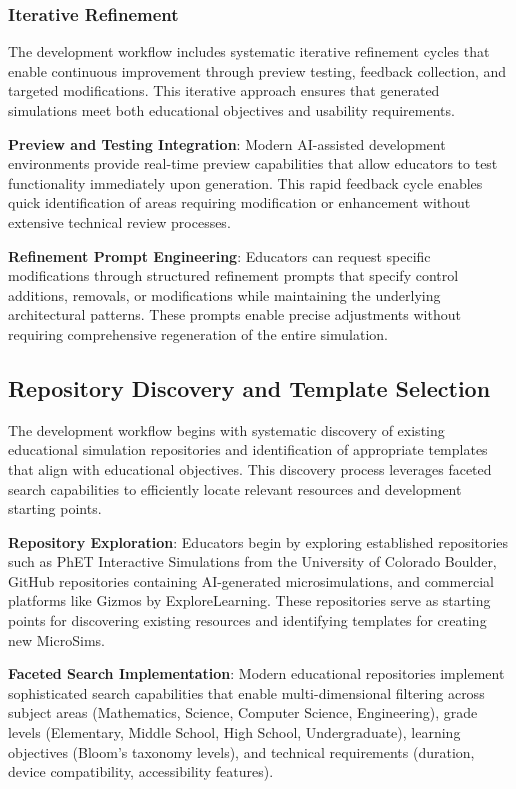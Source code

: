 \subsubsection{Iterative Refinement}

The development workflow includes systematic iterative refinement cycles that enable continuous improvement through preview testing, feedback collection, and targeted modifications. This iterative approach ensures that generated simulations meet both educational objectives and usability requirements.

\textbf{Preview and Testing Integration}: Modern AI-assisted development environments provide real-time preview capabilities that allow educators to test functionality immediately upon generation. This rapid feedback cycle enables quick identification of areas requiring modification or enhancement without extensive technical review processes.

\textbf{Refinement Prompt Engineering}: Educators can request specific modifications through structured refinement prompts that specify control additions, removals, or modifications while maintaining the underlying architectural patterns. These prompts enable precise adjustments without requiring comprehensive regeneration of the entire simulation.

\subsection{Repository Discovery and Template Selection}

The development workflow begins with systematic discovery of existing educational simulation repositories and identification of appropriate templates that align with educational objectives. This discovery process leverages faceted search capabilities to efficiently locate relevant resources and development starting points.

\textbf{Repository Exploration}: Educators begin by exploring established repositories such as PhET Interactive Simulations from the University of Colorado Boulder, GitHub repositories containing AI-generated microsimulations, and commercial platforms like Gizmos by ExploreLearning. These repositories serve as starting points for discovering existing resources and identifying templates for creating new MicroSims.

\textbf{Faceted Search Implementation}: Modern educational repositories implement sophisticated search capabilities that enable multi-dimensional filtering across subject areas (Mathematics, Science, Computer Science, Engineering), grade levels (Elementary, Middle School, High School, Undergraduate), learning objectives (Bloom's taxonomy levels), and technical requirements (duration, device compatibility, accessibility features).

